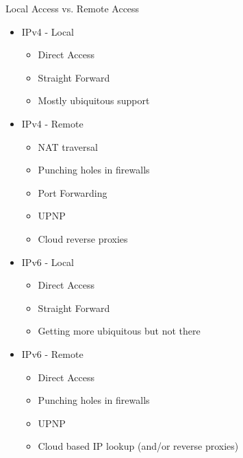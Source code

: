 \begin{frame}
	{Local Access vs. Remote Access}

	\begin{multicols}{2}
		\begin{itemize}
			\item IPv4 - Local
			\begin{itemize}
				\item Direct Access
				\item Straight Forward
				\item Mostly ubiquitous support
			\end{itemize}
		\end{itemize}

		\begin{itemize}
			\item IPv4 - Remote
			\begin{itemize}
				\item NAT traversal
				\item Punching holes in firewalls
				\item Port Forwarding
				\item UPNP
				\item Cloud reverse proxies
			\end{itemize}
		\end{itemize}

		\vfill\null
		\columnbreak

		\begin{itemize}
			\item IPv6 - Local
			\begin{itemize}
				\item Direct Access
				\item Straight Forward
				\item Getting more ubiquitous but not there
			\end{itemize}
		\end{itemize}

		\begin{itemize}
			\item IPv6 - Remote
			\begin{itemize}
				\item Direct Access
				\item Punching holes in firewalls
				\item UPNP
				\item Cloud based IP lookup (and/or reverse proxies)
			\end{itemize}
		\end{itemize}

	\end{multicols}

\end{frame}

\cprotect\note{
}

